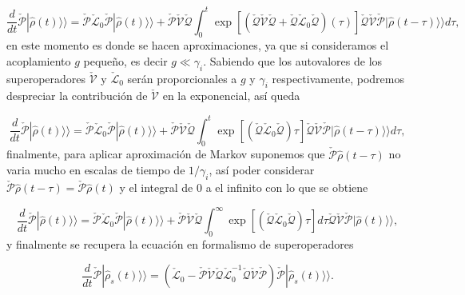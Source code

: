 \begin{appendixs}
\begin{equation*}
    \frac{d}{dt}\check{\mathcal{P}}|\hat{\rho}(t)\rangle \rangle = \check{\mathcal{P}}\check{\mathcal{L}}_{0}\check{\mathcal{P}}|\hat{\rho}(t)\rangle \rangle  + \check{\mathcal{P}}\check{\mathcal{V}}\check{\mathcal{Q}}\int_{0}^{t}\exp \left[\left(\check{\mathcal{Q}}\check{\mathcal{V}}\check{\mathcal{Q}} + \check{\mathcal{Q}}\check{\mathcal{L}}_{0}\check{\mathcal{Q}}\right) (\tau) \right]\check{\mathcal{Q}}\check{\mathcal{V}} \check{\mathcal{P}}|\hat{\rho}(t-\tau)\rangle \rangle d\tau,        
\end{equation*}
en este momento es donde se hacen aproximaciones, ya que si consideramos el acoplamiento $g$ pequeño, es decir $g \ll \gamma_{i}$. Sabiendo que los autovalores de los superoperadores $\check{\mathcal{V}}$ y $\check{\mathcal{L}}_{0}$ serán proporcionales a $g$ y $\gamma_{i}$ respectivamente,  podremos despreciar la contribución de $\check{\mathcal{V}}$ en la exponencial, así queda

\begin{equation*}
    \frac{d}{dt}\check{\mathcal{P}}|\hat{\rho}(t)\rangle \rangle = \check{\mathcal{P}}\check{\mathcal{L}}_{0}\check{\mathcal{P}}|\hat{\rho}(t)\rangle \rangle + \check{\mathcal{P}}\check{\mathcal{V}}\check{\mathcal{Q}}\int_{0}^{t}\exp \left[\left( \check{\mathcal{Q}}\check{\mathcal{L}}_{0}\check{\mathcal{Q}}\right)\tau \right]\check{\mathcal{Q}}\check{\mathcal{V}} \check{\mathcal{P}}|\hat{\rho}(t-\tau)\rangle \rangle d\tau,        
\end{equation*}
finalmente, para aplicar aproximación de Markov suponemos que $\check{\mathcal{P}}\hat{\rho}(t-\tau)$ no varia mucho en escalas de tiempo de $1/\gamma_{i}$, así poder considerar $\check{\mathcal{P}}\hat{\rho}(t-\tau) = \check{\mathcal{P}}\hat{\rho}(t)$ y el integral de $0$ a el infinito con lo que se obtiene

\begin{equation*}
    \frac{d}{dt}\check{\mathcal{P}}|\hat{\rho}(t)\rangle \rangle = \check{\mathcal{P}}\check{\mathcal{L}}_{0}\check{\mathcal{P}}|\hat{\rho}(t)\rangle \rangle + \check{\mathcal{P}}\check{\mathcal{V}}\check{\mathcal{Q}}\int_{0}^{\infty}\exp \left[\left( \check{\mathcal{Q}}\check{\mathcal{L}}_{0}\check{\mathcal{Q}}\right)\tau \right]d\tau \check{\mathcal{Q}}\check{\mathcal{V}} \check{\mathcal{P}}|\hat{\rho}(t)\rangle \rangle ,        
\end{equation*}
y finalmente se recupera la ecuación en formalismo de superoperadores  

\begin{equation*}
    \frac{d}{dt}\check{\mathcal{P}}|\hat{\rho}_{s}(t)\rangle \rangle = (\check{\mathcal{L}}_{0} - \check{\mathcal{P}}\check{\mathcal{V}}\check{\mathcal{Q}}\check{\mathcal{L}}^{-1}_{0}\check{\mathcal{Q}}\check{\mathcal{V}}\check{\mathcal{P}})\check{\mathcal{P}}|\hat{\rho}_{s}(t)\rangle \rangle. 
\end{equation*}




\end{appendixs}
